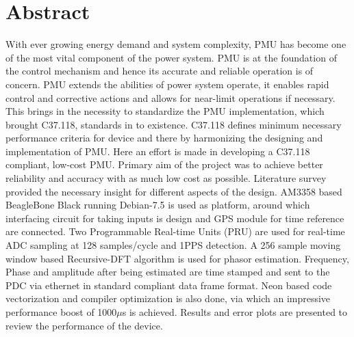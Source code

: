 \chapter*{Abstract}
\singlespace
	With ever growing energy demand and system complexity, PMU has become one of the most vital component of the power system. PMU is at the foundation of the control mechanism and hence its accurate and reliable operation is of concern. PMU extends the abilities of power system operate, it enables rapid control and corrective actions and allows for near-limit operations if necessary. This brings in the necessity to standardize the PMU implementation, which brought C37.118, standards in to existence. C37.118 defines minimum necessary performance criteria for device and there by harmonizing the designing and implementation of PMU. Here an effort is made in developing a C37.118 compliant, low-cost PMU. Primary aim of the project was to achieve better reliability and accuracy with as much low cost as possible. Literature survey provided the necessary insight for different aspects of the design. AM3358 based BeagleBone Black running Debian-7.5 is used as platform, around which interfacing circuit for taking inputs is design and GPS module for time reference are connected. Two Programmable Real-time Units (PRU) are used for real-time ADC sampling at 128 samples/cycle and 1PPS detection. A 256 sample moving window based Recursive-DFT algorithm is used for phasor estimation. Frequency, Phase and amplitude after being estimated are time stamped and sent to the PDC via ethernet in standard compliant data frame format. Neon based code vectorization and compiler optimization is also done, via which an impressive performance boost of 1000$\mu$s is achieved. Results and error plots are presented to review the performance of the device.
\doublespace